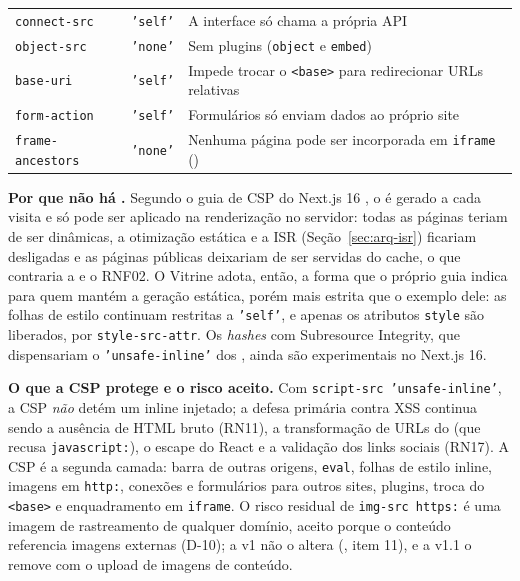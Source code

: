 \begin{longtable}{@{}L{2.8cm}L{3.3cm}L{7.1cm}@{}}
\addlinespace
\texttt{connect-src} & \texttt{'self'} & A interface só chama a própria API\\
\addlinespace
\texttt{object-src} & \texttt{'none'} & Sem plugins (\texttt{object} e \texttt{embed})\\
\addlinespace
\texttt{base-uri} & \texttt{'self'} & Impede trocar o \texttt{<base>} para redirecionar URLs relativas\\
\addlinespace
\texttt{form-action} & \texttt{'self'} & Formulários só enviam dados ao próprio site\\
\addlinespace
\texttt{frame-ancestors} & \texttt{'none'} & Nenhuma página pode ser incorporada em \texttt{iframe} ()\\
\end{longtable}
\endgroup

\textbf{Por que não há .} Segundo o guia de CSP do Next.js 16 \cite{nextjsdocs}, o  é gerado a cada visita e só pode ser aplicado na renderização no servidor: todas as páginas teriam de ser dinâmicas, a otimização estática e a ISR (Seção~\ref{sec:arq-isr}) ficariam desligadas e as páginas públicas deixariam de ser servidas do cache, o que contraria a  e o RNF02. O Vitrine adota, então, a forma que o próprio guia indica para quem mantém a geração estática, porém mais estrita que o exemplo dele: as folhas de estilo continuam restritas a \texttt{'self'}, e apenas os atributos \texttt{style} são liberados, por \texttt{style-src-attr}. Os \emph{hashes} com Subresource Integrity, que dispensariam o \texttt{'unsafe-inline'} dos , ainda são experimentais no Next.js 16.

\textbf{O que a CSP protege e o risco aceito.} Com \texttt{script-src 'unsafe-inline'}, a CSP \emph{não} detém um  inline injetado; a defesa primária contra XSS continua sendo a ausência de HTML bruto (RN11), a transformação de URLs do  (que recusa \texttt{javascript:}), o escape do React e a validação dos links sociais (RN17). A CSP é a segunda camada: barra  de outras origens, \texttt{eval}, folhas de estilo inline, imagens em \texttt{http:}, conexões e formulários para outros sites, plugins, troca do \texttt{<base>} e enquadramento em \texttt{iframe}. O risco residual de \texttt{img-src https:} é uma imagem de rastreamento de qualquer domínio, aceito porque o conteúdo referencia imagens externas (D-10); a v1 não o altera (, item 11), e a v1.1 o remove com o upload de imagens de conteúdo.

